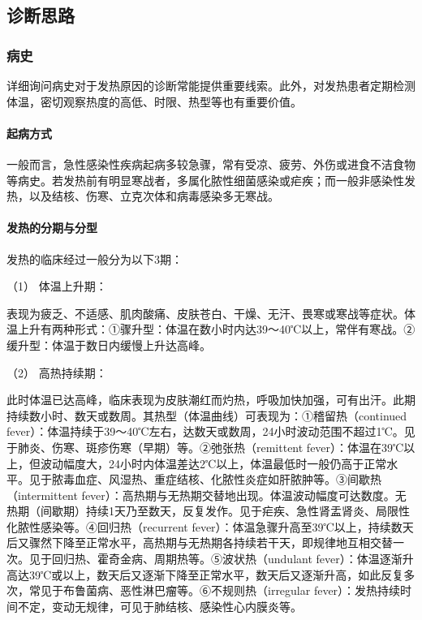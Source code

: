 \subsection{诊断思路}

\subsubsection{病史}

详细询问病史对于发热原因的诊断常能提供重要线索。此外，对发热患者定期检测体温，密切观察热度的高低、时限、热型等也有重要价值。

\paragraph{起病方式}

一般而言，急性感染性疾病起病多较急骤，常有受凉、疲劳、外伤或进食不洁食物等病史。若发热前有明显寒战者，多属化脓性细菌感染或疟疾；而一般非感染性发热，以及结核、伤寒、立克次体和病毒感染多无寒战。

\paragraph{发热的分期与分型}

发热的临床经过一般分为以下3期：

\hypertarget{text00008.htmlux5cux23CHP1-1-2-1-2-1}{}
（1） 体温上升期：

表现为疲乏、不适感、肌肉酸痛、皮肤苍白、干燥、无汗、畏寒或寒战等症状。体温上升有两种形式：①骤升型：体温在数小时内达39～40℃以上，常伴有寒战。②缓升型：体温于数日内缓慢上升达高峰。

\hypertarget{text00008.htmlux5cux23CHP1-1-2-1-2-2}{}
（2） 高热持续期：

此时体温已达高峰，临床表现为皮肤潮红而灼热，呼吸加快加强，可有出汗。此期持续数小时、数天或数周。其热型（体温曲线）可表现为：①稽留热（continued
fever）：体温持续于39～40℃左右，达数天或数周，24小时波动范围不超过1℃。见于肺炎、伤寒、斑疹伤寒（早期）等。②弛张热（remittent
fever）：体温在39℃以上，但波动幅度大，24小时内体温差达2℃以上，体温最低时一般仍高于正常水平。见于脓毒血症、风湿热、重症结核、化脓性炎症如肝脓肿等。③间歇热（intermittent
fever）：高热期与无热期交替地出现。体温波动幅度可达数度。无热期（间歇期）持续1天乃至数天，反复发作。见于疟疾、急性肾盂肾炎、局限性化脓性感染等。④回归热（recurrent
fever）：体温急骤升高至39℃以上，持续数天后又骤然下降至正常水平，高热期与无热期各持续若干天，即规律地互相交替一次。见于回归热、霍奇金病、周期热等。⑤波状热（undulant
fever）：体温逐渐升高达39℃或以上，数天后又逐渐下降至正常水平，数天后又逐渐升高，如此反复多次，常见于布鲁菌病、恶性淋巴瘤等。⑥不规则热（irregular
fever）：发热持续时间不定，变动无规律，可见于肺结核、感染性心内膜炎等。

